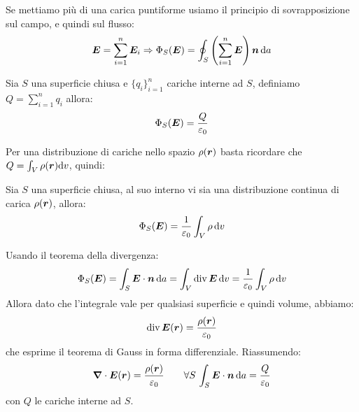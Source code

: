 Se mettiamo più di una carica puntiforme usiamo il principio di sovrapposizione sul campo, e quindi sul flusso:
\[\boldsymbol{E}=\sum_{i=1}^n \boldsymbol{E}_i\Rightarrow \Phi_S(\boldsymbol{E})=\oint_S\left(\sum_{i=1}^n\boldsymbol{E}\right)\boldsymbol{n}\,\mathrm{d} a\]
\begin{Teo}
  Sia $S$ una superficie chiusa e $\{q_i\}_{i=1}^n$ cariche interne ad $S$, definiamo $Q=\sum_{i=1}^n q_i$ allora:
  \begin{equation}
    \Phi_S(\boldsymbol{E})=\frac{Q}{\varepsilon_0}
  \end{equation}
\end{Teo}
Per una distribuzione di cariche nello spazio $\rho(\boldsymbol{r})$ basta ricordare che $Q=\int_V\rho(\boldsymbol{r})\mathrm{d} v$, quindi:
\begin{Teo}[Gauss]
  Sia $S$ una superficie chiusa, al suo interno vi sia una distribuzione continua di carica $\rho(\boldsymbol{r})$, allora:
  \begin{equation}
    \Phi_S(\boldsymbol{E})=\frac{1}{\varepsilon_0}\int_V\rho\,\mathrm{d} v
  \end{equation}
\end{Teo}
Usando il teorema della divergenza:
\[\Phi_S(\boldsymbol{E})=\int_S\boldsymbol{E}\cdot\boldsymbol{n}\,\mathrm{d} a=\int_V\operatorname{div}\boldsymbol{E}\,\mathrm{d} v=\frac{1}{\varepsilon_0}\int_V\rho\,\mathrm{d} v\]
Allora dato che l'integrale vale per qualsiasi superficie e quindi volume, abbiamo:
\begin{equation}
  \operatorname{div} \boldsymbol{E}(\boldsymbol{r})=\frac{\rho(\boldsymbol{r})}{\varepsilon_0}
\end{equation}
che esprime il teorema di Gauss in forma differenziale. Riassumendo:
\begin{equation}
  \boldsymbol{\nabla}\cdot\boldsymbol{E}(\boldsymbol{r})=\frac{\rho(\boldsymbol{r})}{\varepsilon_0}\qquad \forall S\,\int_S \boldsymbol{E}\cdot\boldsymbol{n}\,\mathrm{d} a=\frac{Q}{\varepsilon_0}
\end{equation}
con $Q$ le cariche interne ad $S$.
